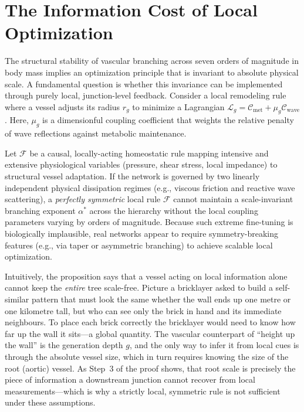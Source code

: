 \section{The Information Cost of Local Optimization}
\label{sec:nogo}

The structural stability of vascular branching across seven orders of magnitude
in body mass implies an optimization principle that is invariant to absolute
physical scale. A fundamental question is whether this invariance can be
implemented through purely local, junction-level feedback. Consider a local
remodeling rule where a vessel adjusts its radius $r_g$ to minimize a Lagrangian
$\mathcal{L}_g = \mathcal{C}_{\mathrm{met}} + \mu_g
\mathcal{C}_{\mathrm{wave}}$. Here, $\mu_g$ is a dimensionful coupling
coefficient that weights the relative penalty of wave reflections against
metabolic maintenance.

\begin{proposition}
\label{thm:nogo}
Let $\mathcal{F}$ be a causal, locally-acting homeostatic rule mapping intensive
and extensive physiological variables (pressure, shear stress, local impedance)
to structural vessel adaptation. If the network is governed by two linearly
independent physical dissipation regimes (e.g., viscous friction and reactive
wave scattering), a \emph{perfectly symmetric} local rule $\mathcal{F}$ cannot
maintain a scale-invariant branching exponent $\alpha^*$ across the hierarchy
without the local coupling parameters varying by orders of magnitude. Because
such extreme fine-tuning is biologically implausible, real networks appear
to require symmetry-breaking features (e.g., via taper or asymmetric branching)
to achieve scalable local optimization.
\end{proposition}

Intuitively, the proposition says that a vessel acting on local
information alone cannot keep the \emph{entire} tree scale-free. Picture a
bricklayer asked to build a self-similar pattern that must look the same whether
the wall ends up one metre or one kilometre tall, but who can see only the brick
in hand and its immediate neighbours. To place each brick correctly the
bricklayer would need to know how far up the wall it sits---a global quantity.
The vascular counterpart of ``height up the wall'' is the generation depth $g$,
and the only way to infer it from local cues is through the absolute vessel
size, which in turn requires knowing the size of the root (aortic) vessel. As
Step~3 of the proof shows, that root scale is precisely the piece of
information a downstream junction cannot recover from local measurements---which
is why a strictly local, symmetric rule is not sufficient under these
assumptions.

